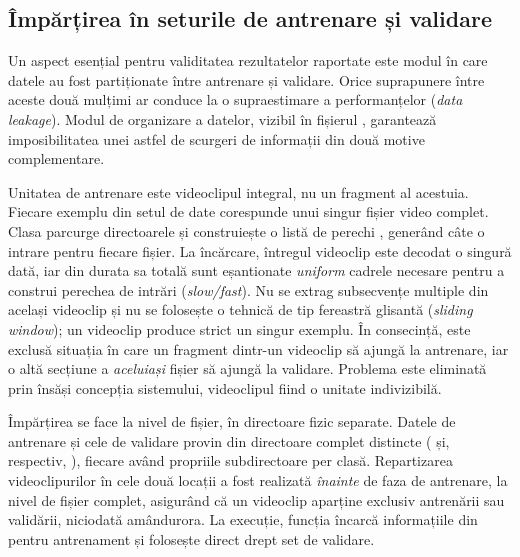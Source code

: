 \documentclass[../../main.tex]{subfiles}
\begin{document}
\subsection{Împărțirea în seturile de antrenare și validare}
\label{subsec:split_train_val}

Un aspect esențial pentru validitatea rezultatelor raportate este modul în care datele au fost partiționate între antrenare și validare. Orice suprapunere între aceste două mulțimi ar conduce la o supraestimare a performanțelor (\textit{data leakage}). Modul de organizare a datelor, vizibil în fișierul , garantează imposibilitatea unei astfel de scurgeri de informații din două motive complementare.

Unitatea de antrenare este videoclipul integral, nu un fragment al acestuia. Fiecare exemplu din setul de date corespunde unui singur fișier video complet. Clasa  parcurge directoarele și construiește o listă de perechi , generând câte o intrare pentru fiecare fișier. La încărcare, întregul videoclip este decodat o singură dată, iar din durata sa totală sunt eșantionate \textit{uniform} cadrele necesare pentru a construi perechea de intrări (\textit{slow/fast}). Nu se extrag subsecvențe multiple din același videoclip și nu se folosește o tehnică de tip fereastră glisantă (\textit{sliding window}); un videoclip produce strict un singur exemplu. În consecință, este exclusă situația în care un fragment dintr-un videoclip să ajungă la antrenare, iar o altă secțiune a \textit{aceluiași} fișier să ajungă la validare. Problema este eliminată prin însăși concepția sistemului, videoclipul fiind o unitate indivizibilă.

Împărțirea se face la nivel de fișier, în directoare fizic separate. Datele de antrenare și cele de validare provin din directoare complet distincte ( și, respectiv, ), fiecare având propriile subdirectoare per clasă. Repartizarea videoclipurilor în cele două locații a fost realizată \textit{înainte} de faza de antrenare, la nivel de fișier complet, asigurând că un videoclip aparține exclusiv antrenării sau validării, niciodată amândurora. La execuție, funcția  încarcă informațiile din  pentru antrenament și folosește direct  drept set de validare.
\end{document}
